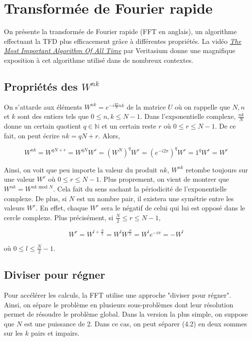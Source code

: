 \newpage
\section{Transformée de Fourier rapide}
On présente la transformée de Fourier rapide (FFT en anglais), un algorithme effectuant la TFD plus efficacement grâce à différentes propriétés. La vidéo \href{https://youtu.be/nmgFG7PUHfo?si=nyxxrVy1AVMsRO4g}{\textit{The Most Important Algorithm Of All Time}} par Veritasium donne une magnifique exposition à cet algorithme utilisé dans de nombreux contextes.

\subsection{Propriétés des $W^{nk}$}
On s'attarde aux éléments $W^{nk} = e^{-i\frac{2\pi}{N}nk}$ de la matrice $U$ où on rappelle que $N,n$ et $k$ sont des entiers tels que $0 \leq n,k \leq N-1$. Dans l'exponentielle complexe, $\frac{nk}{N}$ donne un certain quotient $q \in \mathbb{N}$ et un certain reste $r$ où $0 \leq r \leq N-1$. De ce fait, on peut écrire $nk = qN + r$. Alors,

\begin{equation*}
    W^{nk} = W^{qN + r} = W^{qN}W^r = \left(W^N\right)^q W^r = \left(e^{-i2\pi}\right)^q W^r = 1^q W^r = W^r
\end{equation*}

Ainsi, on voit que peu importe la valeur du produit $nk$, $W^{nk}$ retombe toujours sur une valeur $W^r$ où $0 \leq r \leq N-1$. Plus proprement, on vient de montrer que $W^{nk} = W^{nk \text{ mod } N}$. Cela fait du sens sachant la périodicité de l'exponentielle complexe. De plus, si $N$ est un nombre pair, il existera une symétrie entre les valeurs $W^{r}$. En effet, chaque $W^{r}$ sera le négatif de celui qui lui est opposé dans le cercle complexe. Plus précisément, si $\frac{N}{2} \leq r \leq N-1$, 

\begin{equation*}
    W^r = W^{l + \frac{N}{2}} = W^lW^{\frac{N}{2}} = W^l e^{-i\pi} = -W^l
\end{equation*}

où $0 \leq l \leq \frac{N}{2} - 1$.

\subsection{Diviser pour régner}
Pour accélérer les calculs, la FFT utilise une approche "diviser pour régner". Ainsi, on sépare le problème en plusieurs sous-problèmes dont leur résolution permet de résoudre le problème global. Dans la version la plus simple, on suppose que $N$ est une puissance de 2. Dans ce cas, on peut séparer (4.2) en deux sommes sur les $k$ pairs et impairs.

